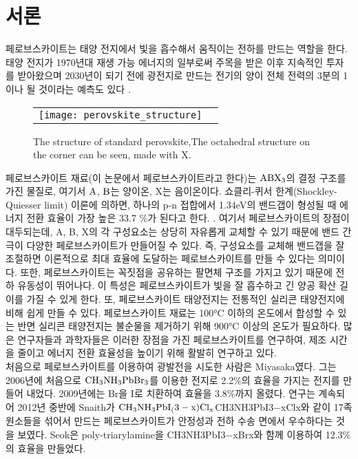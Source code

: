 
\section{서론}

페로브스카이트는 태양 전지에서 빛을 흡수해서 움직이는 전하를 만드는 역할을 한다. 태양 전지가 1970년대 재생 가능 에너지의 일부로써 주목을 받은 이후 지속적인 투자를 받아왔으며 2030년이 되기 전에 광전지로 만드는 전기의 양이 전체 전력의 3분의 1이나 될 것이라는 예측도 있다 \cite{turner2013global}.


\begin{figure}[h!]
	\begin{center}
		\begin{tabular}{cc}
			\texttt{[image: perovskite\_structure]} 
		\end{tabular}
		\caption{The structure of standard perovskite\cite{turner2013global},The octahedral structure on the corner can be seen, made with X. }	
		\label{fig:FIR22}
	\end{center}
\end{figure}
페로브스카이트 재료(이 논문에서 페로브스카이트라고 한다)는 $\rm{ABX_3}$의 결정 구조를 가진 물질로, 여기서 $\rm{A}$, $\rm{B}$는 양이온, X는 음이온이다. 쇼클리-퀴서 한계(Shockley-Quiesser limit) 이론에 의하면, 하나의 p-n 접합에서 1.34eV의 밴드갭이 형성될 때 에너지 전환 효율이 가장 높은 33.7 \%가 된다고 한다. \cite{ruhle2016tabulated}. 여기서 페로브스카이트의 장점이 대두되는데, A, B, X의 각 구성요소는 상당히 자유롭게 교체할 수 있기 때문에 밴드 간극이  다양한 페로브스카이트가 만들어질 수 있다. 즉, 구성요소를 교체해 밴드갭을 잘 조절하면 이론적으로 최대 효율에 도달하는 페로브스카이트를 만들 수 있다는 의미이다. 또한, 페로브스카이트는 꼭짓점을 공유하는 팔면체 구조를 가지고 있기 때문에 전하 유동성이 뛰어나다\cite{linaburg2015studies}. 이 특성은 페로브스카이트가 빛을 잘 흡수하고 긴 양공 확산 길이를 가질 수 있게 한다\cite{green2014emergence}. 또, 페로브스카이트 태양전지는 전통적인 실리콘 태양전지에 비해 쉽게 만들 수 있다. 페로브스카이트 재료는 100°C 이하의 온도에서 합성할 수 있는 반면 실리콘 태양전지는 불순물을 제거하기 위해 900°C 이상의 온도가 필요하다.
많은 연구자들과 과학자들은 이러한 장점을 가진 페로브스카이트를 연구하여, 제조 시간을 줄이고 에너지 전환 효율성을 높이기 위해 활발히 연구하고 있다.\\ 처음으로 페로브스카이트를 이용하여 광발전을 시도한 사람은 Miyasaka였다. 그는 2006년에 처음으로 $\rm{CH_3NH_3PbBr_3}$를 이용한 전지로 2.2\%의 효율을 가지는 전지를 만들어 내었다\cite{kojima2006novel}. 2009년에는 Br을 I로 치환하여 효율을 3.8\%까지 올렸다\cite{kojima2009organometal}. 연구는 계속되어 2012년 중반에 Snaith가  $\rm{CH_3NH_3PbI_(3-x)Cl_x}$CH3NH3PbI3−xClx와 같이 17족 원소들을 섞어서 만드는 페로브스카이트가 안정성과 전하 수송 면에서 우수하다는 것을 보였다\cite{lee2012efficient}. Seok은 poly-triarylamine을 CH3NH3PbI3−xBrx와 함께 이용하여 12.3\%의 효율을 만들었다\cite{noh2013chemical}.\\ 
